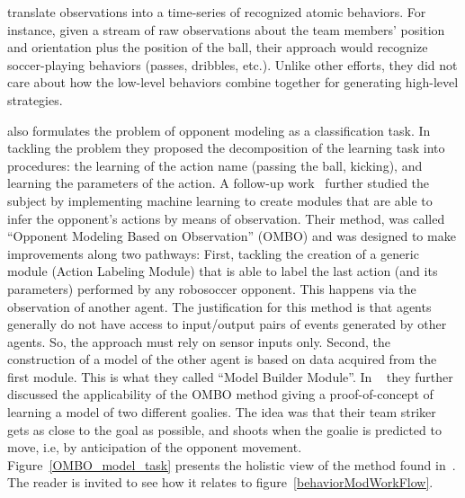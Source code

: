 \cite{kaminka_learning_2003} translate observations into a time-series of recognized atomic behaviors. For instance, given a stream of raw observations about the team members' position and orientation plus the position of the ball, their approach would recognize soccer-playing behaviors (passes, dribbles, etc.). Unlike other efforts, they did not care about how the low-level behaviors combine together for generating high-level strategies.  

\cite{ledezma_predicting_2002} also formulates the problem of opponent modeling as a classification task. In tackling the problem they proposed the decomposition of the learning task into procedures: the learning of the action name (passing the ball, kicking), and learning the parameters of the action. A follow-up work~\cite{ledezma_predicting_2005} further studied the subject by implementing machine learning to create modules that are able to infer the opponent's actions by means of observation. Their method, was called ``Opponent Modeling Based on Observation'' (OMBO) and was designed to make improvements along two pathways: First, tackling the creation of a generic module (Action Labeling Module) that is able to label the last action (and its parameters) performed by any robosoccer opponent. This happens via the observation of another agent. The justification for this method is that agents generally do not have access to input/output pairs of events generated by other agents. So, the approach must rely on sensor inputs only. Second, the construction of a model of the other agent is based on data acquired from the first module. This is what they called ``Model Builder Module''. In ~\cite{ledezma_ombo:_2009} they further discussed the applicability of the OMBO method giving a proof-of-concept of learning a model of two different goalies. The idea was that their team striker gets as close to the goal as possible, and shoots when the goalie is predicted to move, i.e, by anticipation of the opponent movement. Figure~\ref{OMBO_model_task} presents the holistic view of the method found in~\cite{ledezma_predicting_2005,ledezma_ombo:_2009}. The reader is invited to see how it relates to figure~\ref{behaviorModWorkFlow}. %


